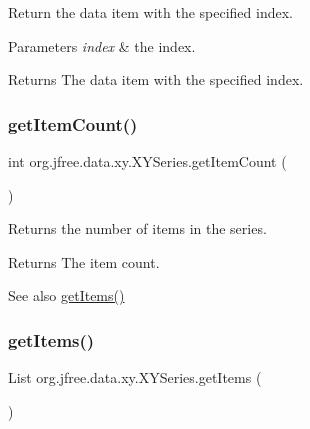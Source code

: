 Return the data item with the specified index.


\begin{DoxyParams}{Parameters}
{\em index} & the index.\\
\hline
\end{DoxyParams}
\begin{DoxyReturn}{Returns}
The data item with the specified index. 
\end{DoxyReturn}
\mbox{\label{classorg_1_1jfree_1_1data_1_1xy_1_1_x_y_series_a7e7f90e3c6019a8591e2c3e8518965d5}} 
\subsubsection{\texorpdfstring{get\+Item\+Count()}{getItemCount()}}
{\footnotesize\ttfamily int org.\+jfree.\+data.\+xy.\+X\+Y\+Series.\+get\+Item\+Count (\begin{DoxyParamCaption}{ }\end{DoxyParamCaption})}

Returns the number of items in the series.

\begin{DoxyReturn}{Returns}
The item count.
\end{DoxyReturn}
\begin{DoxySeeAlso}{See also}
\mbox{\hyperlink{classorg_1_1jfree_1_1data_1_1xy_1_1_x_y_series_a0162d1af1c6129de5feea414d26fa8cc}{get\+Items()}} 
\end{DoxySeeAlso}
\mbox{\label{classorg_1_1jfree_1_1data_1_1xy_1_1_x_y_series_a0162d1af1c6129de5feea414d26fa8cc}} 
\subsubsection{\texorpdfstring{get\+Items()}{getItems()}}
{\footnotesize\ttfamily List org.\+jfree.\+data.\+xy.\+X\+Y\+Series.\+get\+Items (\begin{DoxyParamCaption}{ }\end{DoxyParamCaption})}

